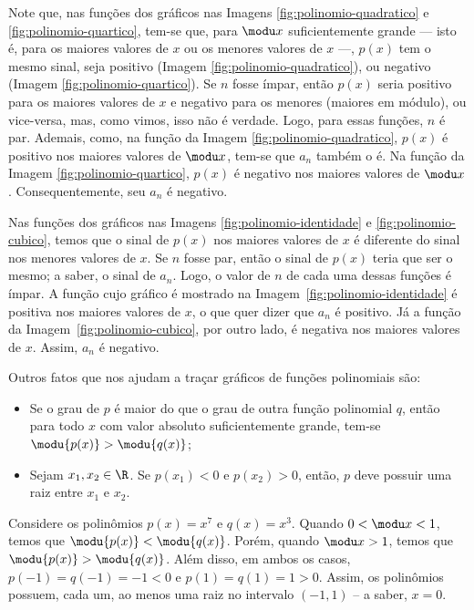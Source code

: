 \begin{solution}
  Note que, nas funções dos gráficos nas Imagens \ref{fig:polinomio-quadratico} e \ref{fig:polinomio-quartico},
  tem-se que, para $\modu x$ suficientemente grande --- isto é, para os maiores valores de $x$ ou os menores valores de $x$ ---, 
  $p(x)$ tem o mesmo sinal, seja positivo (Imagem \ref{fig:polinomio-quadratico}), ou negativo (Imagem \ref{fig:polinomio-quartico}). 
  Se $n$ fosse ímpar, então $p(x)$ seria positivo para os maiores valores de $x$ e negativo para os menores (maiores
  em módulo), ou vice-versa, mas, como vimos, isso não é verdade. 
  Logo, para essas funções, $n$ é par. 
  Ademais, como, na função da Imagem \ref{fig:polinomio-quadratico}, $p(x)$ é positivo nos maiores valores de $\modu x$, 
  tem-se que $a_n$ também o é. Na função da Imagem \ref{fig:polinomio-quartico}, $p(x)$ é negativo nos maiores
  valores de $\modu x$. Consequentemente, seu $a_n$ é negativo.

  Nas funções dos gráficos nas Imagens \ref{fig:polinomio-identidade} e \ref{fig:polinomio-cubico}, temos que o 
  sinal de $p(x)$ nos maiores valores de $x$ é diferente do sinal nos menores valores de $x$.
  Se $n$ fosse par, então o sinal de $p(x)$ teria que ser o mesmo; a saber, o sinal de $a_n$.
  Logo, o valor de $n$ de cada uma dessas funções é ímpar.  
  A função cujo gráfico é mostrado na Imagem~\ref{fig:polinomio-identidade} é positiva nos maiores valores de $x$,
  o que quer dizer que $a_n$ é positivo. 
  Já a função da Imagem~\ref{fig:polinomio-cubico}, por outro lado, é negativa nos maiores valores de $x$.
  Assim, $a_n$ é negativo.
\end{solution}


Outros fatos que nos ajudam a traçar gráficos de funções polinomiais são:
%
\begin{itemize}
\item Se o grau de $p$ é maior do que o grau de outra função polinomial $q$, 
então para todo $x$ com valor absoluto suficientemente grande, 
tem-se $\modu {p(x)} > \modu{q(x)}$;
\item Sejam $x_1, x_2 \in \R$. Se $p(x_1) < 0$ e $p(x_2)>0$,
então, $p$ deve possuir uma raiz entre $x_1$ e $x_2$.
\end{itemize}

\begin{example}
Considere os polinômios $p(x) = x^7 $ e $q(x)=x^3$. 
Quando $0< \modu x < 1$, temos que $\modu {p(x)} < \modu{q(x)}$. 
Porém, quando $ \modu x > 1$, temos que $\modu {p(x)} > \modu{q(x)}$. 
Além disso, em ambos os casos, $p(-1) = q(-1) = -1 <0$ e $p(1) = q(1) = 1 >0$.
Assim, os polinômios possuem, cada um, ao menos uma raiz no
intervalo $(-1, 1)$ -- a saber, $x=0$.
\end{example}

